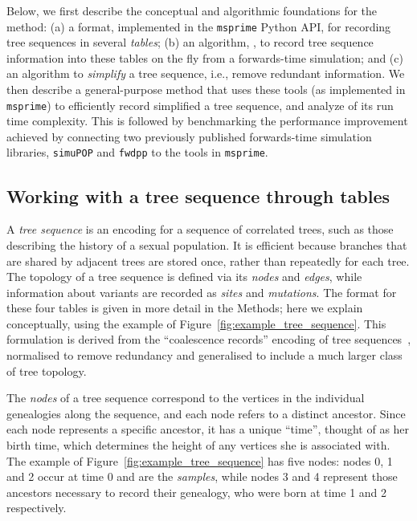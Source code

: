 \documentclass{article}
\newcommand{\simupop}{\texttt{simuPOP}}
\newcommand{\fwdpp}{\texttt{fwdpp}}
\newcommand{\msprime}{\texttt{msprime}}
\begin{document}
Below, we first describe the conceptual and algorithmic foundations for the method:
(a) a format, implemented in the \msprime{} Python API,
for recording tree sequences in several \emph{tables};
(b) an algorithm, , to record tree sequence information into these tables on the fly
    from a forwards-time simulation;
and (c) an algorithm to \emph{simplify} a tree sequence, i.e., remove redundant information.
We then describe a general-purpose method that uses these tools
(as implemented in \msprime{})
to efficiently record simplified a tree sequence,
and analyze of its run time complexity.
This is followed by benchmarking the performance improvement achieved by connecting
two previously published forwards-time simulation libraries,
\simupop{} \citep{simupop} and \fwdpp{} \citep{fwdpp}
to the tools in \msprime{}.


\subsection*{Working with a tree sequence through tables}

A \emph{tree sequence} is an encoding for a sequence of correlated trees,
such as those describing the history of a sexual population.
It is efficient because branches that are shared by adjacent trees are stored once,
rather than repeatedly for each tree.
The topology of a tree sequence is defined via its \emph{nodes} and \emph{edges},
while information about variants are recorded as \emph{sites} and \emph{mutations}.
The format for these four tables is given in more detail in the Methods;
here we explain conceptually,
using the example of Figure~\ref{fig:example_tree_sequence}. This formulation
is derived from the ``coalescence records'' encoding of tree
sequences~\citep{kelleher2016efficient}, normalised to remove redundancy
and generalised to include a much larger class of tree topology.

The \emph{nodes} of a tree sequence
correspond to the vertices in the individual genealogies along the sequence,
and each node refers to a distinct ancestor.
Since each node represents a specific ancestor, it has a unique ``time'',
thought of as her birth time, which determines the height of any vertices
she is associated with.
The example of Figure~\ref{fig:example_tree_sequence} has five nodes:
nodes 0, 1 and 2 occur at time 0 and are the \emph{samples},
while nodes 3 and 4 represent those ancestors necessary to record their genealogy,
who were born at time 1 and 2 respectively.
\end{document}
